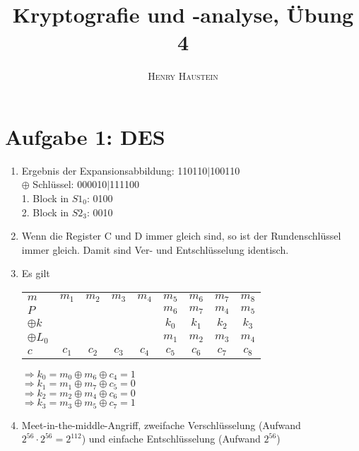 \documentclass{article}
\title{\textbf{Kryptografie und -analyse, Übung 4}}
\author{\textsc{Henry Haustein}}
\date{}
\begin{document}
	\maketitle
	
	\section*{Aufgabe 1: DES}
	\begin{enumerate}[label=(\alph*)]
		\item Ergebnis der Expansionsabbildung: 110110$\vert$100110 \\
		$\oplus$ Schlüssel: 000010$\vert$111100 \\
		1. Block in $S1_0$: 0100 \\
		2. Block in $S2_3$: 0010
		\item Wenn die Register C und D immer gleich sind, so ist der Rundenschlüssel immer gleich. Damit sind Ver- und Entschlüsselung identisch.
		\item Es gilt
		\begin{center}
			\begin{tabular}{l|cccccccc}
				$m$ & $m_1$ & $m_2$ & $m_3$ & $m_4$ & $m_5$ & $m_6$ & $m_7$ & $m_8$ \\
				$P$ & & & & & $m_6$ & $m_7$ & $m_4$ & $m_5$ \\
				$\oplus k$ & & & & & $k_0$ & $k_1$ & $k_2$ & $k_3$ \\
				$\oplus L_0$ & & & & & $m_1$ & $m_2$ & $m_3$ & $m_4$ \\
				\hline
				$c$ & $c_1$ & $c_2$ & $c_3$ & $c_4$ & $c_5$ & $c_6$ & $c_7$ & $c_8$
			\end{tabular}
		\end{center}
		$\Rightarrow k_0 = m_0 \oplus m_6 \oplus c_4 = 1$ \\
		$\Rightarrow k_1 = m_1 \oplus m_7 \oplus c_5 = 0$ \\
		$\Rightarrow k_2 = m_2 \oplus m_4 \oplus c_6 = 0$ \\
		$\Rightarrow k_3 = m_3 \oplus m_5 \oplus c_7 = 1$
		\item Meet-in-the-middle-Angriff, zweifache Verschlüsselung (Aufwand $2^{56}\cdot 2^{56} = 2^{112}$) und einfache Entschlüsselung (Aufwand $2^{56}$)
	\end{enumerate}
\end{document}

